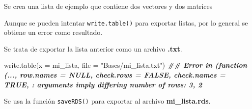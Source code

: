 \documentclass[
]{book}
\newenvironment{Shaded}{\begin{snugshade}}{\end{snugshade}}
\newcommand{\AttributeTok}[1]{\textcolor[rgb]{0.77,0.63,0.00}{#1}}
\newcommand{\CommentTok}[1]{\textcolor[rgb]{0.56,0.35,0.01}{\textit{#1}}}
\newcommand{\ConstantTok}[1]{\textcolor[rgb]{0.00,0.00,0.00}{#1}}
\newcommand{\DecValTok}[1]{\textcolor[rgb]{0.00,0.00,0.81}{#1}}
\newcommand{\DocumentationTok}[1]{\textcolor[rgb]{0.56,0.35,0.01}{\textbf{\textit{#1}}}}
\newcommand{\FunctionTok}[1]{\textcolor[rgb]{0.00,0.00,0.00}{#1}}
\newcommand{\NormalTok}[1]{#1}
\newcommand{\OtherTok}[1]{\textcolor[rgb]{0.56,0.35,0.01}{#1}}
\newcommand{\SpecialCharTok}[1]{\textcolor[rgb]{0.00,0.00,0.00}{#1}}
\newcommand{\StringTok}[1]{\textcolor[rgb]{0.31,0.60,0.02}{#1}}
\begin{document}
Se crea una lista de ejemplo que contiene dos vectores y dos matrices

\begin{Shaded}
\end{Shaded}

Aunque se pueden intentar \texttt{write.table()} para exportar listas, por lo general se obtiene un error como resultado.

Se trata de exportar la lista anterior como un archivo \textbf{.txt}.

\begin{Shaded}
\begin{Highlighting}[]
\FunctionTok{write.table}\NormalTok{(}\AttributeTok{x =}\NormalTok{ mi\_lista, }\AttributeTok{file =} \StringTok{"Bases/mi\_lista.txt"}\NormalTok{)}
\DocumentationTok{\#\# Error in (function (..., row.names = NULL, check.rows = FALSE, check.names = TRUE, : arguments imply differing number of rows: 3, 2}
\end{Highlighting}
\end{Shaded}

Se usa la función \texttt{saveRDS()} para exportar al archivo \textbf{mi\_lista.rds}.
\end{document}
